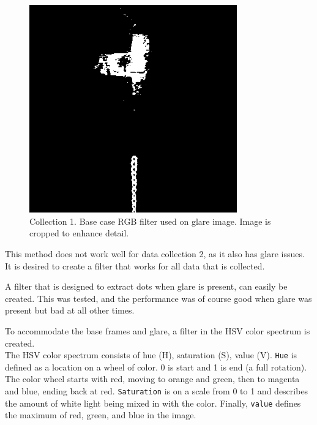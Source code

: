 \begin{figure}[h]
    \centering
        \includegraphics[width=0.8\textwidth]{figures/ImageAnalysis/filtered_glare1_noglarefilt.png}
        \caption{Collection 1. Base case RGB filter used on glare image. Image is cropped to enhance detail.}
        \label{fig:glare1_no_glare_filt}
\end{figure}
\FloatBarrier
This method does not work well for data collection 2, as it also has glare issues. It is desired to create a filter that works for all data that is collected. 


A filter that is designed to extract dots when glare is present, can easily be created. This was tested, and the performance was of course good when glare was present but bad at all other times.  


To accommodate the base frames and glare, a filter in the HSV color spectrum is created.\\

The HSV color spectrum consists of hue (H), saturation (S), value (V). \texttt{Hue} is defined as a location on a wheel of color. 0 is start and 1 is end (a full rotation). The color wheel starts with red, moving to orange and green, then to magenta and blue, ending back at red. \texttt{Saturation} is on a scale from 0 to 1 and describes the amount of white light being mixed in with the color. Finally, \texttt{value} defines the maximum of red, green, and blue in the image. \\

